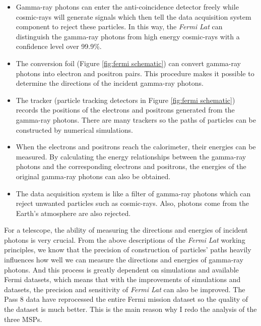 \documentclass[12pt]{report}
\begin{document}
      \begin{itemize}
        \item Gamma-ray photons can enter the anti-coincidence detector freely while 
          cosmic-rays will generate signals which then tell the data acquisition system 
          component to reject these particles. In this way, the \textit{Fermi Lat} can 
          distinguish the gamma-ray photons from high energy cosmic-rays with a confidence 
          level over 99.9\%.
        \item The conversion foil (Figure \ref{fig:fermi schematic}) can convert  
          gamma-ray photons into electron and positron pairs. This procedure makes it 
          possible to determine the directions of the incident gamma-ray photons. 
        \item The tracker (particle tracking detectors in Figure \ref{fig:fermi schematic}) 
          records the positions of the electrons and positrons generated from the gamma-ray 
          photons. There are many trackers so the paths of particles can be constructed by 
          numerical simulations.
        \item When the electrons and positrons reach the calorimeter, their energies can be
          measured. By calculating the energy relationships between the gamma-ray photons and 
          the corresponding electrons and positrons, the energies of the original gamma-ray 
          photons can also be obtained. 
        \item The data acquisition system is like a filter of gamma-ray photons which can 
          reject unwanted particles such as cosmic-rays. Also, photons come from the Earth's 
          atmosphere are also rejected. 
      \end{itemize}

      For a telescope, the ability of measuring the directions and energies of incident 
      photons is very crucial. From the above descriptions of the \textit{Fermi Lat} 
      working principles, we know that the precision of construction of particles' paths 
      heavily influences how well we can measure the directions and energies of gamma-ray 
      photons. And this process is greatly dependent on simulations and available Fermi datasets,
      which means that with the improvements of simulations and datasets,
      the precision and sensitivity of \textit{Fermi Lat} can also be improved. The Pass 8 data 
      have reprocessed the entire Fermi mission dataset so the quality of the dataset is much 
      better. This is the main reason why I redo the analysis of the three MSPs.
\end{document}

